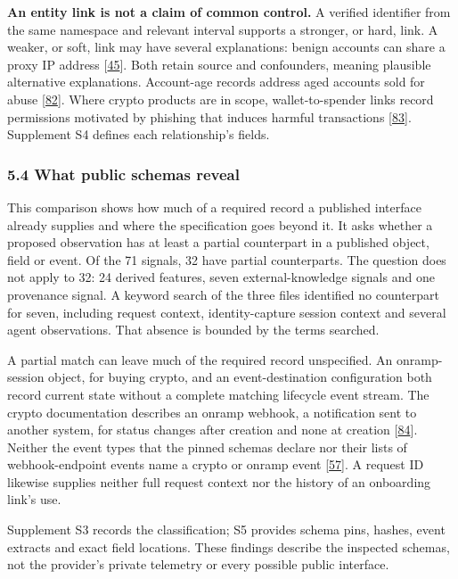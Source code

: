 \documentclass[
  11pt,
]{article}
\begin{document}
\textbf{An entity link is not a claim of common control.} A verified
identifier from the same namespace and relevant interval supports a
stronger, or hard, link. A weaker, or soft, link may have several
explanations: benign accounts can share a proxy IP address
{[}\protect\hyperlink{ref-Liu2018GEM}{45}{]}. Both retain source and
confounders, meaning plausible alternative explanations. Account-age
records address aged accounts sold for abuse
{[}\protect\hyperlink{ref-Thomas2013}{82}{]}. Where crypto products are
in scope, wallet-to-spender links record permissions motivated by
phishing that induces harmful transactions
{[}\protect\hyperlink{ref-Chen2025Phishing}{83}{]}. Supplement S4
defines each relationship's fields.

\hypertarget{what-public-schemas-reveal}{%
\subsubsection{5.4 What public schemas
reveal}\label{what-public-schemas-reveal}}

This comparison shows how much of a required record a published
interface already supplies and where the specification goes beyond it.
It asks whether a proposed observation has at least a partial
counterpart in a published object, field or event. Of the 71 signals, 32
have partial counterparts. The question does not apply to 32: 24 derived
features, seven external-knowledge signals and one provenance signal. A
keyword search of the three files identified no counterpart for seven,
including request context, identity-capture session context and several
agent observations. That absence is bounded by the terms searched.

A partial match can leave much of the required record unspecified. An
onramp-session object, for buying crypto, and an event-destination
configuration both record current state without a complete matching
lifecycle event stream. The crypto documentation describes an onramp
webhook, a notification sent to another system, for status changes after
creation and none at creation
{[}\protect\hyperlink{ref-Stripe2026CryptoOnramp}{84}{]}. Neither the
event types that the pinned schemas declare nor their lists of
webhook-endpoint events name a crypto or onramp event
{[}\protect\hyperlink{ref-StripeOpenAPI2026}{57}{]}. A request ID
likewise supplies neither full request context nor the history of an
onboarding link's use.

Supplement S3 records the classification; S5 provides schema pins,
hashes, event extracts and exact field locations. These findings
describe the inspected schemas, not the provider's private telemetry or
every possible public interface.
\end{document}
